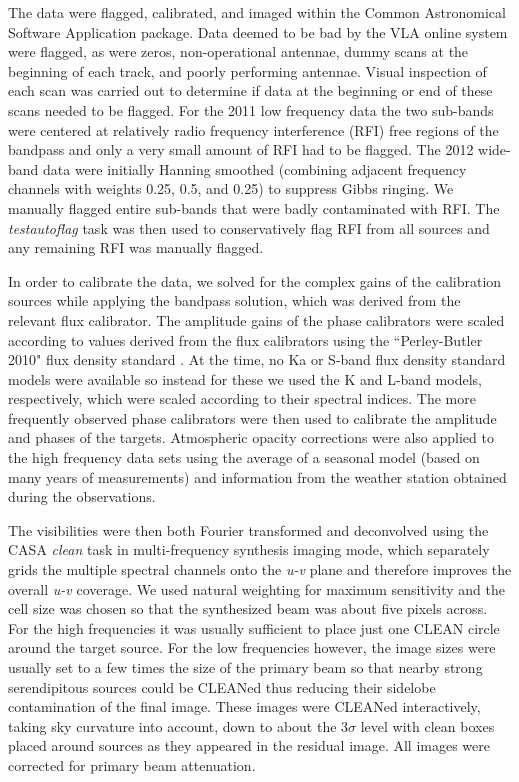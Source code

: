 \documentclass[iop]{emulateapj}
\begin{document}
The data were flagged, calibrated, and imaged within the Common Astronomical Software Application  \cite[CASA;][]{2007ASPC..376..127M} package. Data deemed to be bad by the VLA online system were flagged, as were zeros, non-operational antennae, dummy scans at the beginning of each track, and poorly performing antennae. Visual inspection of each scan was carried out to determine if data at the beginning or end of these scans needed to be flagged. For the 2011 low frequency data the two sub-bands were centered at relatively radio frequency interference (RFI) free regions of the bandpass and only a very small amount of RFI had to be flagged.   The 2012 wide-band data were initially Hanning smoothed (combining adjacent frequency channels with weights 0.25, 0.5, and 0.25) to suppress Gibbs ringing. We manually flagged entire sub-bands that were badly contaminated with RFI. The \textit{testautoflag} task was then used to conservatively flag RFI from all sources and any remaining RFI was manually flagged. 

In order to calibrate the data, we solved for the complex gains of the calibration sources while applying the bandpass solution, which was derived from the relevant flux calibrator.  The amplitude gains of the phase calibrators were scaled according to values derived from the flux calibrators using the ``Perley-Butler 2010" flux density standard \citep{2013ApJS..204...19P}. At the time, no Ka or S-band flux density standard models were available so instead for these we used the K and L-band models, respectively, which were scaled according to their spectral indices. The more frequently observed phase calibrators were then used to calibrate the amplitude and phases of the targets. Atmospheric opacity corrections were also applied to the high frequency data sets using the average of a seasonal model (based on many years of measurements) and information from the weather station obtained during the observations.

The visibilities were then both Fourier transformed and deconvolved using the CASA \textit{clean} task in multi-frequency synthesis imaging mode, which separately grids the multiple spectral channels onto the \textit{u-v} plane and therefore improves the overall \textit{u-v} coverage. We used natural weighting for maximum sensitivity and the cell size was chosen so that the synthesized beam was about five pixels across. For the high frequencies it was usually sufficient to place just one CLEAN circle around the target source.  For the low frequencies however, the image sizes were usually set to a few times the size of the primary beam so that nearby strong serendipitous sources could be CLEANed thus reducing their sidelobe contamination of the final image. These images were CLEANed interactively, taking sky curvature into account, down to about the $3\sigma$  level with clean boxes placed around sources as they appeared in the residual image. All images were corrected for  primary beam attenuation. 
\end{document}
